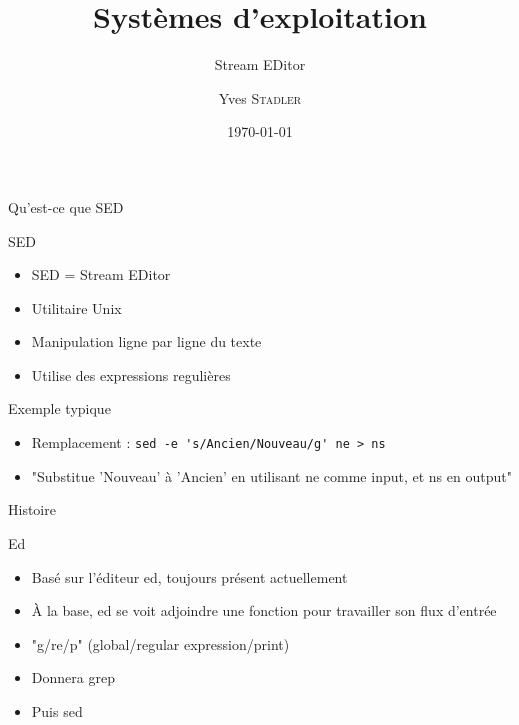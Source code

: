 
\title{Systèmes d'exploitation}
\subtitle{Stream EDitor}

\author{Yves \textsc{Stadler}}

\date{\today}




\begin{frame}
\titlepage
\end{frame}


\def\ftitle{Qu'est-ce que SED}
\begin{frame}[containsverbatim]{\ftitle}
\def\blocktitle{SED}
\begin{block}{\blocktitle}
\begin{itemize}
\item SED = Stream EDitor
\item Utilitaire Unix
\item Manipulation ligne par ligne du texte
\item Utilise des expressions regulières
\end{itemize}
\end{block}
\def\blocktitle{Exemple typique}
\begin{block}{\blocktitle}
\begin{itemize}
\item Remplacement : \verb!sed -e 's/Ancien/Nouveau/g' ne > ns!
\item "Substitue 'Nouveau' à 'Ancien' en utilisant ne comme input, et ns en output"
\end{itemize}
\end{block}
\end{frame}


\def\ftitle{Histoire}
\begin{frame}[containsverbatim]{\ftitle}
\def\blocktitle{Ed}
\begin{block}{\blocktitle}
\begin{itemize}
\item Basé sur l'éditeur ed, toujours présent actuellement
\item À la base, ed se voit adjoindre une fonction pour travailler son flux d'entrée
\item "g/re/p" (global/regular expression/print)
\item Donnera grep
\item Puis sed
\end{itemize}
\end{block}
\end{frame}


